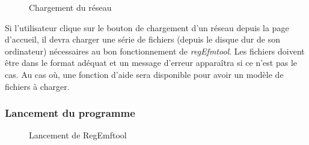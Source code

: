 \begin{figure}[!ht]
	\begin{center}
		\caption{Chargement du réseau}
  		\label{chargement}
  	\end{center}	
\end{figure}

Si l'utilisateur clique sur le bouton de chargement d'un réseau depuis la page d'accueil, il devra charger une série de fichiers (depuis le disque dur de son ordinateur) nécessaires au bon fonctionnement de \textit{regEfmtool}. Les fichiers doivent être dans le format adéquat et un message d'erreur appara\^itra si ce n'est pas le cas. Au cas où, une fonction d'aide sera disponible pour avoir un modèle de fichiers à charger. 

\subsubsection{Lancement du programme}

\begin{figure}[!ht]
	\begin{center}
		\caption{Lancement de RegEmftool}
  		\label{lancement}
  	\end{center}	
\end{figure}

